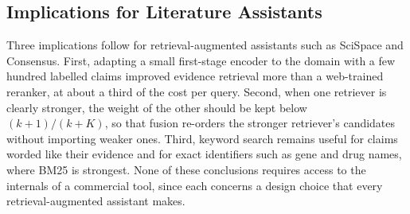 \subsection{Implications for Literature Assistants}
\label{sec:disc-tools}

Three implications follow for retrieval-augmented assistants such as SciSpace and Consensus.
First, adapting a small first-stage encoder to the domain with a few hundred labelled claims
improved evidence retrieval more than a web-trained reranker, at about a third of the cost per
query. Second, when one retriever is clearly stronger, the weight of the other should be kept
below $(k + 1)/(k + K)$, so that fusion re-orders the stronger retriever's candidates without
importing weaker ones. Third, keyword search remains useful for claims worded like their evidence
and for exact identifiers such as gene and drug names, where BM25 is strongest. None of these
conclusions requires access to the internals of a commercial tool, since each concerns a design
choice that every retrieval-augmented assistant makes.
